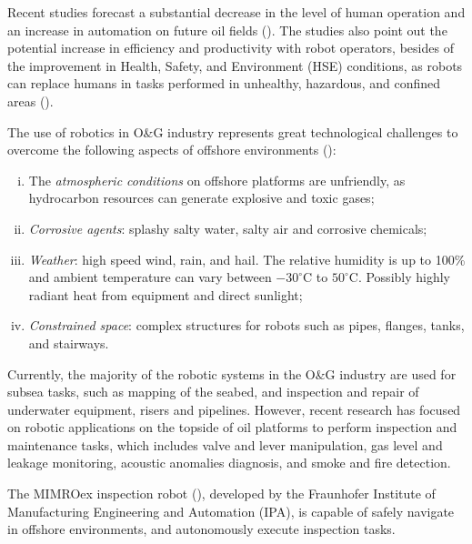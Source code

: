 \documentclass{ifacconf}
\begin{document}
Recent studies forecast a substantial decrease in the level of human operation
and an increase in automation on future oil fields (\cite{skourup2009robotized}).
The studies also point out the potential increase
in efficiency and productivity with robot operators, besides of the improvement in
Health, Safety, and Environment (HSE) conditions, as robots can replace humans
in tasks performed in unhealthy, hazardous, and confined areas (\cite{pal}).

The use of robotics in O\&G industry represents great technological challenges
to overcome the following aspects of offshore environments (\cite{chen}):

\begin{enumerate}[i)]
\item The \emph{atmospheric conditions} on offshore platforms are unfriendly, as
hydrocarbon resources can generate explosive and toxic gases; %
\item \emph{Corrosive agents}: splashy salty water, salty air and corrosive chemicals;
\item \emph{Weather}: high speed wind, rain, and hail. The relative humidity is
up to 100\% and ambient temperature can vary between $-30^{\circ}$C to
$50^{\circ}$C. Possibly highly radiant heat from equipment and direct sunlight;
\item \emph{Constrained space}: complex structures for robots
such as pipes, flanges, tanks, and stairways.
\end{enumerate}


Currently, the majority of the robotic systems in the O\&G industry are
used for subsea tasks, such as mapping of the seabed, and inspection and repair
of underwater equipment, risers and pipelines. However, recent research has
focused on robotic applications on the topside of oil platforms to perform
inspection and maintenance tasks, which includes valve and lever manipulation,
gas level and leakage monitoring, acoustic anomalies diagnosis, and
smoke and fire detection.

The MIMROex inspection robot (\cite{mimroex}), developed by the Fraunhofer
Institute of Manufacturing Engineering and Automation (IPA), is
capable of safely navigate in offshore environments, and autonomously execute
inspection tasks. 
\end{document}
